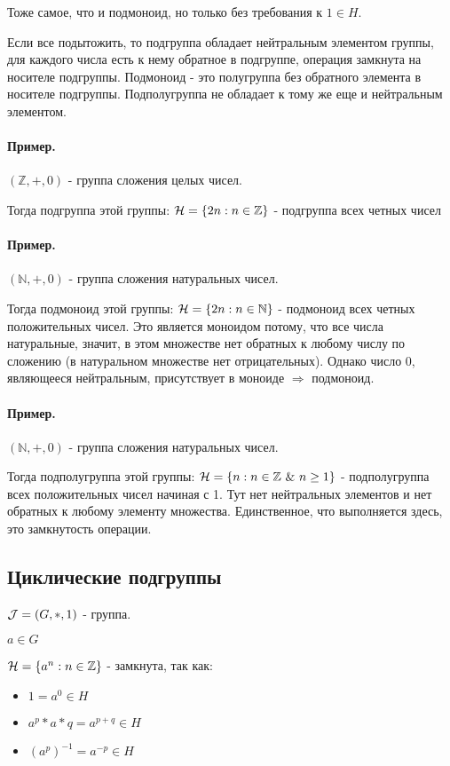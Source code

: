 \documentclass{report}
\newcommand{\band}{\mbox{ } \& \mbox{ }}
\begin{document}
Тоже самое, что и подмоноид, но только без требования к $1 \in H$.

\medskip

Если все подытожить, то подгруппа обладает нейтральным элементом группы,
для каждого числа есть к нему обратное в подгруппе, операция замкнута на носителе
подгруппы. Подмоноид - это полугруппа без обратного элемента в носителе подгруппы.
Подполугруппа не обладает к тому же еще и нейтральным элементом.

\paragraph*{Пример.}
$(\mathbb{Z}, +, 0)$ - группа сложения целых чисел.

Тогда подгруппа этой группы: ${\cal H} = \{2n:n \in \mathbb{Z}\}$ - подгруппа всех четных чисел

\paragraph*{Пример.}
$(\mathbb{N}, +, 0)$ - группа сложения натуральных чисел.

Тогда подмоноид этой группы: ${\cal H} = \{2n:n \in \mathbb{N}\}$ - подмоноид всех четных положительных чисел.
Это является моноидом потому, что все числа натуральные, значит, в этом множестве
нет обратных к любому числу по сложению (в натуральном множестве нет отрицательных). Однако
число 0, являющееся нейтральным, присутствует в моноиде $\Rightarrow$ подмоноид.

\paragraph*{Пример.}
$(\mathbb{N}, +, 0)$ - группа сложения натуральных чисел.

Тогда подполугруппа этой группы: ${\cal H} = \{n:n \in \mathbb{Z} \band n \geq 1\}$ - подполугруппа всех
положительных чисел начиная с 1. Тут нет нейтральных элементов и нет обратных к любому элементу множества.
Единственное, что выполняется здесь, это замкнутость операции.

\subsection{Циклические подгруппы}
${\cal J} = (G, *, 1)$ - группа.

$a \in G$

${\cal H} = \{a^{n}: n \in \mathbb{Z}\}$ - замкнута, так как:
\begin{itemize}
    \item $1 = a^{0} \in H$
    \item $a^p * a*q = a^{p+q} \in H$
    \item $(a^p)^{-1} = a^{-p} \in H$
\end{itemize}
\end{document}
